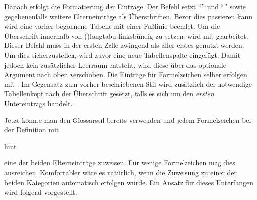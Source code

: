 \documentclass[%
  english,ngerman,%
  cdgeometry=no,DIV=12,%
  cd=false,cdfont=false,cdtitle=true,%
  headings=normal,%
  automark,%
  listof=toc,%
]{tudscrartcl}
\begin{document}
Danach erfolgt die Formatierung der Einträge. Der Befehl  
setzt \enquote{\greeklettersname} und \enquote{\romanlettersname} sowie 
gegebenenfalls weitere Elterneinträge als Überschriften. Bevor dies passieren 
kann wird eine vorher begonnene Tabelle mit einer Fußlinie beendet. Um die 
Überschrift innerhalb von \Environment(){longtabu} linksbündig zu 
setzen, wird mit  gearbeitet. Dieser Befehl muss in der 
ersten Zelle zwingend als aller erstes genutzt werden. Um dies sicherzustellen, 
wird zuvor eine neue Tabellenspalte eingefügt. Damit jedoch kein zusätzlicher 
Leerraum entsteht, wird diese über das optionale Argument nach oben verschoben.
Die Einträge für Formelzeichen selber erfolgen mit . Im 
Gegensatz zum vorher beschriebenen Stil  wird zusätzlich 
der notwendige Tabellenkopf nach der Überschrift gesetzt, falls es sich um den 
\emph{ersten} Untereintrags handelt.

Jetzt könnte man den Glossarstil  bereits verwenden 
und jedem Formelzeichen bei der Definition mit 
\begin{Code}{hint}
\end{Code}
eine der beiden Elterneinträge zuweisen. Für wenige Formelzeichen mag dies 
ausreichen. Komfortabler wäre es natürlich, wenn die Zuweisung zu einer der 
beiden Kategorien automatisch erfolgen würde. Ein Ansatz für dieses Unterfangen 
wird folgend vorgestellt. 

\end{document}
